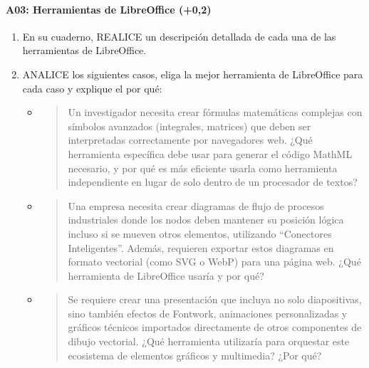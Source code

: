 \documentclass[letterpaper,10pt,spanish]{sphinxmanual}
\begin{document}
\paragraph{A03: Herramientas de LibreOffice (+0,2)}
\label{\detokenize{cursos/ofimatica10/periodo01/G03:a03-herramientas-de-libreoffice-0-2}}
\sphinxAtStartPar
{}
\begin{enumerate}
%
\item {} 
\sphinxAtStartPar
En su cuaderno, REALICE un descripción detallada de cada una de las herramientas de LibreOffice.

\item {} 
\sphinxAtStartPar
ANALICE los siguientes casos, eliga la mejor herramienta de LibreOffice para cada caso y explique el por qué:
\begin{itemize}
\item {} \begin{quote}

\sphinxAtStartPar
Un investigador necesita crear fórmulas matemáticas complejas con símbolos avanzados (integrales, matrices) que deben ser interpretadas correctamente por navegadores web. ¿Qué herramienta específica debe usar para generar el código MathML necesario, y por qué es más eficiente usarla como herramienta independiente en lugar de solo dentro de un procesador de textos?
\end{quote}

\item {} \begin{quote}

\sphinxAtStartPar
Una empresa necesita crear diagramas de flujo de procesos industriales donde los nodos deben mantener su posición lógica incluso si se mueven otros elementos, utilizando “Conectores Inteligentes”. Además, requieren exportar estos diagramas en formato vectorial (como SVG o WebP) para una página web. ¿Qué herramienta de LibreOffice usaría y por qué?
\end{quote}

\item {} \begin{quote}

\sphinxAtStartPar
Se requiere crear una presentación que incluya no solo diapositivas, sino también efectos de Fontwork, animaciones personalizadas y gráficos técnicos importados directamente de otros componentes de dibujo vectorial. ¿Qué herramienta utilizaría para orquestar este ecosistema de elementos gráficos y multimedia? ¿Por qué?
\end{quote}


\end{itemize}
\end{enumerate}
\end{document}
